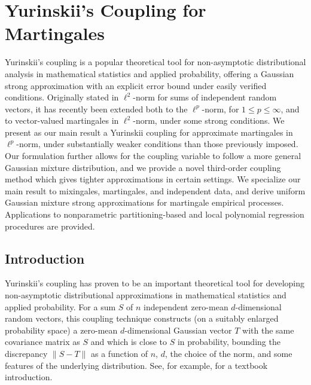 
\chapter{Yurinskii's Coupling for Martingales}
\label{ch:yurinskii}

Yurinskii's coupling is a popular theoretical tool for non-asymptotic
distributional analysis in mathematical statistics and applied probability,
offering a Gaussian strong approximation with an explicit error bound under
easily verified conditions. Originally stated in $\ell^2$-norm for sums of
independent random vectors, it has recently been extended both to the
$\ell^p$-norm, for $1 \leq p \leq \infty$, and to vector-valued martingales in
$\ell^2$-norm, under some strong conditions. We present as our main result a
Yurinskii coupling for approximate martingales in $\ell^p$-norm, under
substantially weaker conditions than those previously imposed. Our formulation
further allows for the coupling variable to follow a more general Gaussian
mixture distribution, and we provide a novel third-order coupling method which
gives tighter approximations in certain settings. We specialize our main result
to mixingales, martingales, and independent data, and derive uniform Gaussian
mixture strong approximations for martingale empirical processes. Applications
to nonparametric partitioning-based and local polynomial regression procedures
are provided.

\section{Introduction}

Yurinskii's coupling \citep{yurinskii1978error} has proven to be an important
theoretical tool for developing non-asymptotic distributional approximations in
mathematical statistics and applied probability. For a sum $S$ of $n$
independent zero-mean $d$-dimensional random vectors, this coupling technique
constructs (on a suitably enlarged probability space)
a zero-mean $d$-dimensional
Gaussian vector $T$ with the same covariance matrix as $S$ and which is close
to $S$ in probability, bounding the discrepancy $\|S-T\|$ as a function of $n$,
$d$, the choice of the norm, and some features of the underlying distribution.
See, for example, \citet[Chapter 10]{pollard2002user} for a textbook
introduction.


